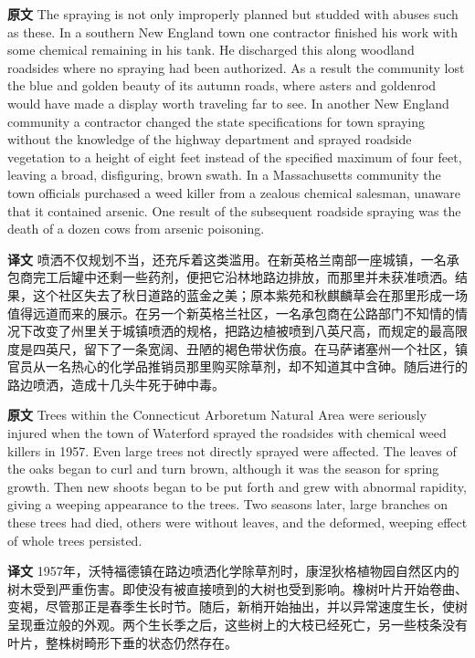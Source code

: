 \documentclass[UTF8,zihao=-4]{ctexart}
\begin{document}
\noindent\textbf{原文} The spraying is not only improperly planned but studded with abuses such as these. In a southern New England town one contractor finished his work with some chemical remaining in his tank. He discharged this along woodland roadsides where no spraying had been authorized. As a result the community lost the blue and golden beauty of its autumn roads, where asters and goldenrod would have made a display worth traveling far to see. In another New England community a contractor changed the state specifications for town spraying without the knowledge of the highway department and sprayed roadside vegetation to a height of eight feet instead of the specified maximum of four feet, leaving a broad, disfiguring, brown swath. In a Massachusetts community the town officials purchased a weed killer from a zealous chemical salesman, unaware that it contained arsenic. One result of the subsequent roadside spraying was the death of a dozen cows from arsenic poisoning.
\par
\noindent\textbf{译文} 喷洒不仅规划不当，还充斥着这类滥用。在新英格兰南部一座城镇，一名承包商完工后罐中还剩一些药剂，便把它沿林地路边排放，而那里并未获准喷洒。结果，这个社区失去了秋日道路的蓝金之美；原本紫苑和秋麒麟草会在那里形成一场值得远道而来的展示。在另一个新英格兰社区，一名承包商在公路部门不知情的情况下改变了州里关于城镇喷洒的规格，把路边植被喷到八英尺高，而规定的最高限度是四英尺，留下了一条宽阔、丑陋的褐色带状伤痕。在马萨诸塞州一个社区，镇官员从一名热心的化学品推销员那里购买除草剂，却不知道其中含砷。随后进行的路边喷洒，造成十几头牛死于砷中毒。
\par\medskip

\noindent\textbf{原文} Trees within the Connecticut Arboretum Natural Area were seriously injured when the town of Waterford sprayed the roadsides with chemical weed killers in 1957. Even large trees not directly sprayed were affected. The leaves of the oaks began to curl and turn brown, although it was the season for spring growth. Then new shoots began to be put forth and grew with abnormal rapidity, giving a weeping appearance to the trees. Two seasons later, large branches on these trees had died, others were without leaves, and the deformed, weeping effect of whole trees persisted.
\par
\noindent\textbf{译文} 1957年，沃特福德镇在路边喷洒化学除草剂时，康涅狄格植物园自然区内的树木受到严重伤害。即使没有被直接喷到的大树也受到影响。橡树叶片开始卷曲、变褐，尽管那正是春季生长时节。随后，新梢开始抽出，并以异常速度生长，使树呈现垂泣般的外观。两个生长季之后，这些树上的大枝已经死亡，另一些枝条没有叶片，整株树畸形下垂的状态仍然存在。
\par\medskip
\end{document}
